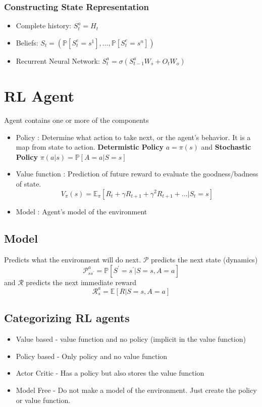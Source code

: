 \documentclass[a4paper,10pt]{article}
\begin{document}
\subsubsection{Constructing State Representation}

\begin{itemize}
 \item Complete history: $S_t^a = H_t$
 \item Beliefs: $S_t = (\mathbb{P}[S_t^e = s^1], \ldots, \mathbb{P}[S_t^e = s^n])$
 \item Recurrent Neural Network: $S_t^a = \sigma(S_{t-1}^a W_s + O_t W_o)$
\end{itemize}


\section{RL Agent}

Agent contains one or more of the components
\begin{itemize}
 \item Policy : Determine what action to take next, or the agent's behavior. It is a map from state to action. {\bf Determistic Policy} $a = \pi(s)$ and {\bf Stochastic Policy} $\pi(a|s) = \mathbb{P}[A = a | S = s]$
 \item Value function : Prediction of future reward to evaluate the goodness/badness of state.
 $$
 V_\pi(s) = \mathbb{E}_\pi \left[ R_t + \gamma R_{t+1} + \gamma^2 R_{t+1} + \ldots | S_t = s \right]
 $$
 \item Model : Agent's model of the environment
\end{itemize}

\subsection{Model}

Predicts what the environment will do next. $\mathcal{P}$ predicts the next state (dynamics) 
$$
\mathcal{P}_{ss^\prime}^a = \mathbb{P} \left[ S^\prime = s^\prime | S = s, A = a \right]
$$
and $\mathcal{R}$ predicts the next immediate reward
$$
\mathcal{R}_s^a = \mathbb{E} \left[ R | S = s, A = a \right]
$$

\subsection{Categorizing RL agents}

\begin{itemize}
 \item Value based - value function and no policy (implicit in the value function)
 \item Policy based - Only policy and no value function
 \item Actor Critic - Has a policy but also stores the value function
 \item Model Free - Do not make a model of the environment. Just create the policy or value function.
\end{itemize}
\end{document}
